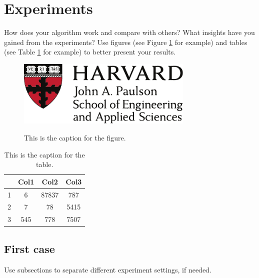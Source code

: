 \section{Experiments}
\label{sec:experiments}

How does your algorithm work and compare with others? What insights have you gained from the experiments? Use figures (see Figure \ref{fig:1} for example) and tables (see Table \ref{tab:1} for example) to better present your results.

\begin{figure}[ht!]
\centering
\includegraphics[width=0.75\textwidth]{figure/SEASLogo.pdf}
\label{fig:1}
\caption{This is the caption for the figure.}
\end{figure}

\begin{table}[ht!]
\centering
\begin{tabular}{|c|c c c|} 
 \hline
  &Col1 & Col2 & Col3 \\ [0.5ex] 
 \hline
 1 & 6 & 87837 & 787 \\ 
 2 & 7 & 78 & 5415 \\
 3 & 545 & 778 & 7507 \\[1ex] 
 \hline
\end{tabular}
\caption{This is the caption for the table.}
\label{tab:1}
\end{table}

\subsection{First case}

Use subsections to separate different experiment settings, if needed.

